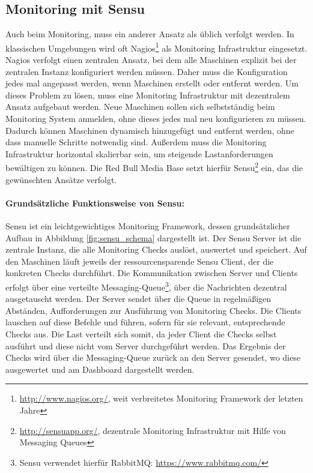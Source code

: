 \subsection{Monitoring mit Sensu}
\label{sec:sensu:main}
Auch beim Monitoring, muss ein anderer Ansatz als üblich verfolgt werden. In klassischen Umgebungen wird oft Nagios\footnote{\url{http://www.nagios.org/}, weit verbreitetes Monitoring Framework der letzten Jahre} als Monitoring Infrastruktur eingesetzt. Nagios verfolgt einen zentralen Ansatz, bei dem alle Maschinen explizit bei der zentralen Instanz konfiguriert werden müssen. Daher muss die Konfiguration jedes mal angepasst werden, wenn Maschinen erstellt oder entfernt werden. Um dieses Problem zu lösen, muss eine Monitoring Infrastruktur mit dezentralem Ansatz aufgebaut werden. Neue Maschinen sollen sich selbstständig beim Monitoring System anmelden, ohne dieses jedes mal neu konfigurieren zu müssen. Dadurch können Maschinen dynamisch hinzugefügt und entfernt werden, ohne dass manuelle Schritte notwendig sind. Außerdem muss die Monitoring Infrastruktur horizontal skalierbar sein, um steigende Lastanforderungen bewältigen zu können. Die Red Bull Media Base setzt hierfür Sensu\footnote{\url{http://sensuapp.org/}, dezentrale Monitoring Infrastruktur mit Hilfe von Messaging Queues} ein, das die gewünschten Ansätze verfolgt.

\paragraph{Grundsätzliche Funktionsweise von Sensu:}
Sensu ist ein leichtgewichtiges Monitoring Framework, dessen grundsätzlicher Aufbau in Abbildung \ref{fig:sensu_schema} dargestellt ist. Der Sensu Server ist die zentrale Instanz, die alle Monitoring Checks auslöst, auswertet und speichert. Auf den Maschinen läuft jeweils der ressourcensparende Sensu Client, der die konkreten Checks durchführt. Die Kommunikation zwischen Server und Clients erfolgt über eine verteilte Messaging-Queue\footnote{Sensu verwendet hierfür RabbitMQ: \url{https://www.rabbitmq.com/}}, über die Nachrichten dezentral ausgetauscht werden. Der Server sendet über die Queue in regelmäßigen Abständen, Aufforderungen zur Ausführung von Monitoring Checks. Die Clients lauschen auf diese Befehle und führen, sofern für sie relevant, entsprechende Checks aus. Die Last verteilt sich somit, da jeder Client die Checks selbst ausführt und diese nicht vom Server durchgeführt werden. Das Ergebnis der Checks wird über die Messaging-Queue zurück an den Server gesendet, wo diese ausgewertet und am Dashboard dargestellt werden. 

